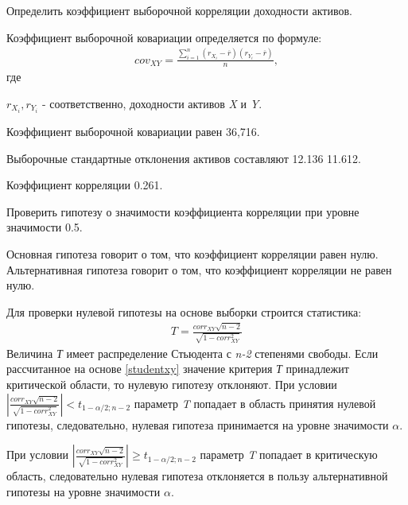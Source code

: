 \documentclass[12pt, table, twoside, a4paper]{exam}
\begin{document}
\begin{questions}
	\noaddpoints
	\begin{subparts}
		\subpart[10] Определить коэффициент выборочной корреляции доходности активов.
		
		\begin{solution}[6em]
			Коэффициент выборочной ковариации  определяется по формуле:
			\begin{align*}
			cov_{XY}=\frac{\sum_{i=1}^n \left(r_{X_i}-\overline{r} \right)\left(r_{Y_i}-\overline{r} \right)}{n},
			\end{align*}
			где 
			
			$r_{X_i}, r_{Y_i}$ - соответственно, доходности активов \textit{X} и \textit{Y}.
			
			Коэффициент выборочной ковариации равен 36,716.
			
			Выборочные стандартные отклонения активов составляют 12.136 11.612.
			
			Коэффициент корреляции 0.261.
		\end{solution}
		
		\subpart[10] Проверить гипотезу о значимости коэффициента корреляции при уровне значимости 0.5.
		
		\begin{solution}[6em]
			
			\raggedright
			Основная гипотеза говорит о том, что коэффициент корреляции равен нулю. Альтернативная гипотеза говорит о том, что коэффициент корреляции не равен нулю.
			
			Для проверки нулевой гипотезы на основе выборки строится статистика:
			\begin{align}
			\label{studentxy}
			T=\frac{corr_{XY}\sqrt{n-2}}{\sqrt{1-corr_{XY}^2}}
			\end{align}
			Величина \textit{Т} имеет распределение Стьюдента с \textit{n-2} степенями свободы. Если рассчитанное на основе \eqref{studentxy} значение критерия \textit{Т }принадлежит критической области, то нулевую гипотезу отклоняют. 
			При условии $\left|\frac{corr_{XY}\sqrt{n-2}}{\sqrt{1-corr_{XY}^2}}\right|<t_{1-\alpha/2;n-2}$ параметр \textit{T} попадает в область принятия нулевой гипотезы, следовательно, нулевая гипотеза принимается на уровне значимости $\alpha$.
			
			При условии $\left|\frac{corr_{XY}\sqrt{n-2}}{\sqrt{1-corr_{XY}^2}}\right|\geq t_{1-\alpha/2;n-2}$ параметр \textit{T} попадает в критическую область, следовательно нулевая гипотеза отклоняется в пользу альтернативной гипотезы на уровне значимости $\alpha$.
			

\end{solution}
\end{subparts}
\end{questions}
\end{document}
